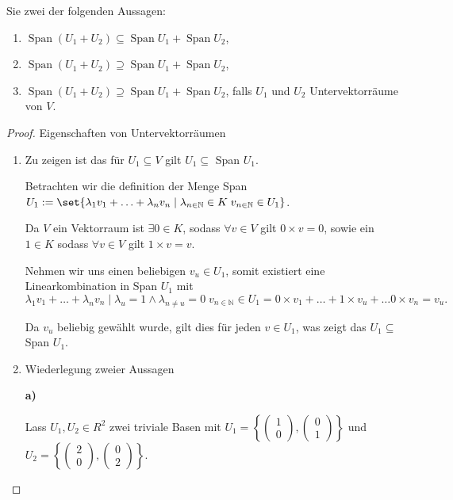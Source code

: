 \documentclass{../problemset}
\begin{document}
\begin{problem}
\begin{enumerate}
	      Sie zwei der folgenden Aussagen:
	      \begin{enumerate}[label=\alph*)]
		      \item $\operatorname{Span}(U_1 + U_2) \subseteq \operatorname{Span} U_1 + \operatorname{Span} U_2$,
		      \item $\operatorname{Span}(U_1 + U_2) \supseteq \operatorname{Span} U_1 + \operatorname{Span} U_2$,
		      \item $\operatorname{Span}(U_1 + U_2) \supseteq \operatorname{Span} U_1 + \operatorname{Span} U_2$, falls $U_1$ und $U_2$ Untervektorräume von $V$.
	      \end{enumerate}
\end{enumerate}
\begin{proof}
	Eigenschaften von Untervektorräumen
	\begin{enumerate}
		\item Zu zeigen ist das für $U_1 \subseteq V$ gilt $U_1 \subseteq$ Span $U_1$.

		      Betrachten wir die definition der Menge Span $U_1 := \set{\lambda_1 v_1 + \ldots + \lambda_n v_n \mid \lambda_{n \in \mathbb{N}} \in K \; v_{n \in \mathbb{N}} \in U_1}$.

		      Da $V$ ein Vektorraum ist $\exists 0 \in K$, sodass $\forall v \in V$ gilt $0 \times v = 0$, sowie ein $1 \in K$ sodass $\forall v \in V$ gilt $1 \times v = v$.

		      Nehmen wir uns einen beliebigen $v_u \in U_1$, somit existiert eine Linearkombination in Span $U_1$ mit \[
			      \lambda_1 v_1 + \ldots + \lambda_n v_n \mid \lambda_u = 1 \land \lambda_{n \ne u} = 0 \; v_{n \in \mathbb{N}} \in U_1 = 0 \times v_1 + \ldots + 1 \times v_u + \ldots 0 \times v_n = v_u.
		      \]

		      Da \(v_u\) beliebig gewählt wurde, gilt dies für jeden \(v \in U_1\), was zeigt das $U_1 \subseteq$ Span $U_1$. \checkmark
		\item Wiederlegung zweier Aussagen

		      \textbf{a)}

		      Lass \(U_1, U_2 \in R^2\) zwei triviale Basen mit \(U_1 = \left\{\begin{pmatrix}
			      1 \\ 0
		      \end{pmatrix},
		      \begin{pmatrix}
			      0 \\ 1
		      \end{pmatrix}\right\}\) und \(U_2 = \left\{\begin{pmatrix}
			      2 \\ 0
		      \end{pmatrix},
		      \begin{pmatrix}
			      0 \\ 2
		      \end{pmatrix}\right\}\).


\end{enumerate}
\end{proof}
\end{problem}
\end{document}
